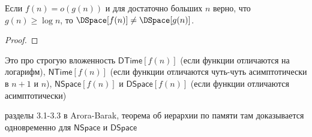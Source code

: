 	\begin{theorem}
		Если $f(n)=o(g(n))$ и для достаточно больших $n$ верно, что $g(n) \ge \log n$, то $\DSpace[f(n)] \neq \DSpace[g(n)]$.
	\end{theorem}
	\begin{proof}
		\TODO
	\end{proof}

	Это про строгую вложенность $\mathsf{DTime}[f(n)]$ (если функции отличаются на логарифм), $\mathsf{NTime}[f(n)]$ (если функции отличаются чуть-чуть асимптотически в $n+1$ и $n$),
	$\mathsf{NSpace}[f(n)]$ и $\mathsf{DSpace}[f(n)]$ (если функции отличаются асимптотически)

	\TODO разделы 3.1-3.3 в Arora-Barak, теорема об иерархии по памяти там доказывается одновременно для $\mathsf{NSpace}$ и $\mathsf{DSpace}$
